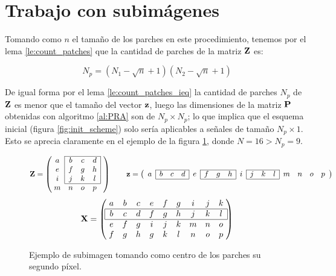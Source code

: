 \section{Trabajo con subim\'agenes}
Tomando como $n$ el tamaño de los parches en este procedimiento, tenemos por el lema \ref{le:count_patches} que la cantidad de parches de la matriz $\Z$ es: 

\begin{equation}
	N_p = (N_1 - \sqrt{n} + 1)(N_2 - \sqrt{n} + 1)
	\label{eq:patches}
\end{equation}

De igual forma por el lema \ref{le:count_patches_ieq} la cantidad de parches $N_p$ de $\Z$ es menor que el tamaño del vector $\z$, luego las dimensiones de la matriz $\P$ obtenidas con algoritmo \ref{al:PRA} son de $N_p \times N_p$; lo que implica que el esquema inicial (figura \ref{fig:init_scheme}) solo ser\'ia aplicables a señales de tamaño $N_p \times 1$. Esto se aprecia claramente en el ejemplo de la figura \ref{ex:subimages}, donde $N = 16 > N_p = 9$.

\begin{figure}[h]
	\[\Z = \left(
		\;\begin{matrix}
		\cline{2-4}
			a & \multicolumn{1}{|c}{b} & c & \multicolumn{1}{c|}{d}\\
			e & \multicolumn{1}{|c}{f} & g & \multicolumn{1}{c|}{h}\\
			i & \multicolumn{1}{|c}{j} & k & \multicolumn{1}{c|}{l}\\\cline{2-4}
			m & n & o & p\\
		\end{matrix}\;\;\;
	\right)
	\qquad\z = \left(
		\begin{array}{c|ccc|c|ccc|c|ccc|cccc}
			\cline{2-4}\cline{6-8}\cline{10-12}
			a & b & c & d & e & f & g & h & i & j & k & l & m & n & o & p \\
			\cline{2-4}\cline{6-8}\cline{10-12}
		\end{array}
	\right)
	\]
	\[
	\X = \left(
		\;\begin{matrix}
			a & b & c & e & f & g & i & j & k\\\hline
			\multicolumn{1}{|c}{b} & c & d & f & g & h & j & k & \multicolumn{1}{c|}{l}\\\hline
			e & f & g & i & j & k & m & n & o\\
			f & g & h & g & k & l & n & o & p\\
		\end{matrix}\;
	\right)
	\]
	\caption{Ejemplo de subimagen tomando como centro de los parches su segundo p\'ixel.}
	\label{ex:subimages}
\end{figure}

